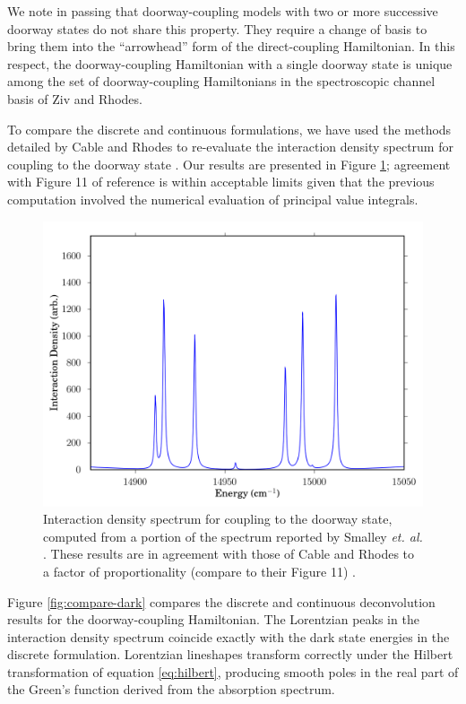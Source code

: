 We note in passing that doorway-coupling models with two or more
successive doorway states do not share this property.  They require a
change of basis to bring them into the ``arrowhead'' form of the
direct-coupling Hamiltonian.  In this respect, the doorway-coupling
Hamiltonian with a single doorway state is unique among the set of
doorway-coupling Hamiltonians in the spectroscopic channel basis of
Ziv and Rhodes.

To compare the discrete and continuous formulations, we have used the
methods detailed by Cable and Rhodes to re-evaluate the interaction
density spectrum for coupling to the doorway state \cite{cable80}.
Our results are presented in Figure \ref{fig:ids}; agreement with
Figure 11 of reference \cite{cable80} is within acceptable limits
given that the previous computation involved the numerical evaluation
of principal value integrals.

\begin{figure}
  \caption{Interaction density spectrum for coupling to the doorway
    state, computed from a portion of the  spectrum reported
    by Smalley \emph{et. al.}  \cite{smalley75}.  These results are in
    agreement with those of Cable and Rhodes to a factor of
    proportionality (compare to their Figure 11) \cite{cable80}. }
  \label{fig:ids}
  \centering
  \includegraphics[width=5in]{smalley-ids1.png}
\end{figure}

Figure \ref{fig:compare-dark} compares the discrete and continuous
deconvolution results for the doorway-coupling Hamiltonian.  The
Lorentzian peaks in the interaction density spectrum coincide exactly
with the dark state energies in the discrete formulation.  Lorentzian
lineshapes transform correctly under the Hilbert transformation of
equation \ref{eq:hilbert}, producing smooth poles in the real part of
the Green's function derived from the absorption spectrum.  

